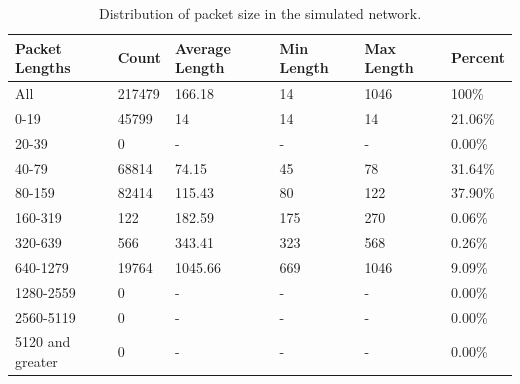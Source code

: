 \begin{table}[t]
	\caption[Distribution of packet size in the simulated network.]{\small Distribution of packet size in the simulated network.}
	\begin{center}
		\begin{tabular}{llllll}
			\hline Packet Lengths   & Count  & Average Length & Min Length & Max Length & Percent \\ \hline \hline
			All              & 217479 & 166.18         & 14         & 1046       & 100\%   \\
			0-19             & 45799  & 14             & 14         & 14         & 21.06\% \\
			20-39            & 0      & -              & -          & -          & 0.00\%  \\
			40-79            & 68814  & 74.15          & 45         & 78         & 31.64\% \\
			80-159           & 82414  & 115.43         & 80         & 122        & 37.90\% \\
			160-319          & 122    & 182.59         & 175        & 270        & 0.06\%  \\
			320-639          & 566    & 343.41         & 323        & 568        & 0.26\%  \\
			640-1279         & 19764  & 1045.66        & 669        & 1046       & 9.09\%  \\
			1280-2559        & 0      & -              & -          & -          & 0.00\%  \\
			2560-5119        & 0      & -              & -          & -          & 0.00\%  \\
			5120 and greater & 0      & -              & -          & -          & 0.00\% \\  \hline
		\end{tabular}
	\end{center}
	\label{tab:packet-size}
\end{table}

